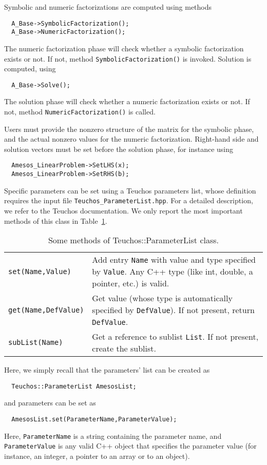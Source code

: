 \documentclass[11pt]{SANDreport}
\begin{document}
Symbolic and numeric factorizations are computed using methods
\begin{verbatim}
  A_Base->SymbolicFactorization();
  A_Base->NumericFactorization();
\end{verbatim}
The numeric factorization phase will check whether a symbolic
factorization exists or not. If not, method
\verb!SymbolicFactorization()! is invoked.  Solution is computed, using
\begin{verbatim}
  A_Base->Solve();
\end{verbatim}
The solution phase will check whether a numeric factorization exists or
not. If not, method \verb!NumericFactorization()! is called.

Users must provide the nonzero structure of the matrix for the symbolic
phase, and the actual nonzero values for the numeric
factorization. Right-hand side and solution vectors must be set before
the solution phase, for instance using
\begin{verbatim}
  Amesos_LinearProblem->SetLHS(x);
  Amesos_LinearProblem->SetRHS(b);
\end{verbatim}

Specific parameters can be set using a Teuchos parameters list, whose
definition requires the input file \verb!Teuchos_ParameterList.hpp!. For
a detailed description, we refer to the Teuchos documentation. We only
report the most important methods of this class in
Table~\ref{tab:teuchos}.

\begin{table}[htbp]
  \centering
  \begin{tabular}{| p{4cm} | p{10cm} |}
    \hline
    \verb!set(Name,Value)! & Add entry \verb!Name! with value and type
    specified by \verb!Value!. Any C++ type (like int, double, a
    pointer, etc.) is valid. \\
    \verb!get(Name,DefValue)! & Get value (whose type is automatically
    specified by \verb!DefValue!). If not present, return
    \verb!DefValue!. \\
    \verb!subList(Name)! & Get a reference to sublist \verb!List!. If not
    present, create the sublist. \\
    \hline
  \end{tabular}
  \caption{Some methods of Teuchos::ParameterList class.}
  \label{tab:teuchos}
\end{table}


Here, we simply recall that the
parameters' list can be created as
\begin{verbatim}
  Teuchos::ParameterList AmesosList;
\end{verbatim}
and parameters can be set as
\begin{verbatim}
  AmesosList.set(ParameterName,ParameterValue);
\end{verbatim}
Here, \verb!ParameterName! is a string containing the parameter name,
and \verb!ParameterValue! is any valid C++ object that specifies the
parameter value (for instance, an integer, a pointer to an array or to
an object).
\end{document}
